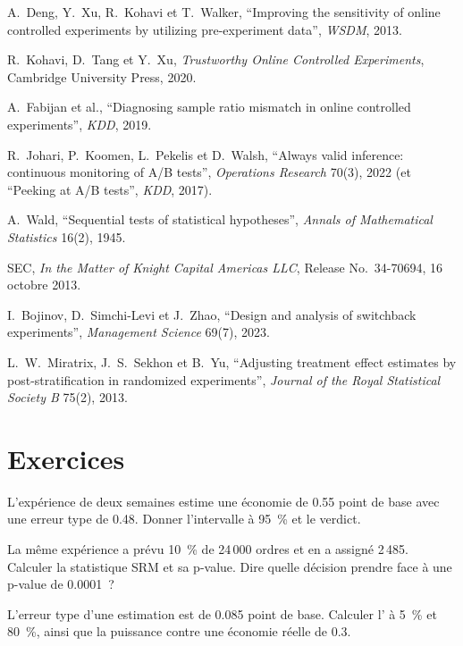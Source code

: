 \begin{omsources}
\item A.~Deng, Y.~Xu, R.~Kohavi et T.~Walker, ``Improving the sensitivity of online controlled experiments by utilizing pre-experiment data'', \emph{WSDM}, 2013.
\item R.~Kohavi, D.~Tang et Y.~Xu, \emph{Trustworthy Online Controlled Experiments}, Cambridge University Press, 2020.
\item A.~Fabijan et al., ``Diagnosing sample ratio mismatch in online controlled experiments'', \emph{KDD}, 2019.
\item R.~Johari, P.~Koomen, L.~Pekelis et D.~Walsh, ``Always valid inference: continuous monitoring of A/B tests'', \emph{Operations Research} 70(3), 2022
(et ``Peeking at A/B tests'', \emph{KDD}, 2017).
\item A.~Wald, ``Sequential tests of statistical hypotheses'', \emph{Annals of Mathematical Statistics} 16(2), 1945.
\item SEC, \emph{In the Matter of Knight Capital Americas LLC}, Release No.~34-70694, 16 octobre 2013.
\item I.~Bojinov, D.~Simchi-Levi et J.~Zhao, ``Design and analysis of switchback experiments'', \emph{Management Science} 69(7), 2023.
\item L.~W.~Miratrix, J.~S.~Sekhon et B.~Yu, ``Adjusting treatment effect estimates by post-stratification in randomized experiments'', \emph{Journal of the
Royal Statistical Society B} 75(2), 2013.
\end{omsources}

\section{Exercices}

\begin{exercise}[$\star$]\label{exo:rs:live-experiments:1}
L'expérience de deux semaines estime une économie de 0.55 point de base avec une erreur type de 0.48. Donner l'intervalle à 95~\% et le verdict.
\end{exercise}

\begin{exercise}[$\star$]\label{exo:rs:live-experiments:2}
La même expérience a prévu 10~\% de 24\,000 ordres et en a assigné 2\,485. Calculer la statistique SRM et sa p-value. Dire quelle décision prendre face à une p-value de 0.0001~?
\end{exercise}

\begin{exercise}[$\star$]\label{exo:rs:live-experiments:3}
L'erreur type d'une estimation est de 0.085 point de base. Calculer l' à 5~\% et 80~\%, ainsi que la puissance contre une économie réelle de 0.3.
\end{exercise}

